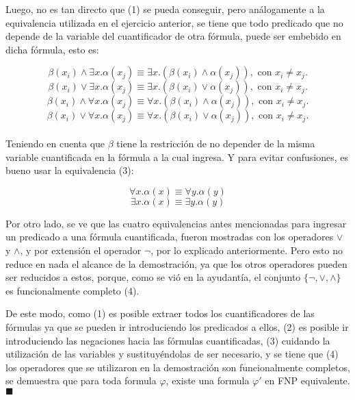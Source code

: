 \documentclass[letter]{article}
\begin{document}
\begin{pregunta}{2}
\begin{enumerate}
			Luego, no es tan directo que (1) se pueda conseguir, pero análogamente a la equivalencia utilizada en el ejercicio anterior, se tiene que todo predicado que no depende de la variable del cuantificador de otra fórmula, puede ser embebido en dicha fórmula, esto es:
			
			$$\beta(x_i) \wedge \exists x. \alpha(x_j) \equiv \exists x. (\beta(x_i) \wedge \alpha(x_j)), \text{\ \ \ \ \ con $x_i\neq x_j$.}$$
			$$\beta(x_i) \vee \exists x. \alpha(x_j) \equiv \exists x. (\beta(x_i) \vee \alpha(x_j)), \text{\ \ \ \ \ con $x_i\neq x_j$.}$$
			$$\beta(x_i) \wedge \forall x. \alpha(x_j) \equiv \forall x. (\beta(x_i) \wedge \alpha(x_j)), \text{\ \ \ \ \ con $x_i\neq x_j$.}$$
			$$\beta(x_i) \vee \forall x. \alpha(x_j) \equiv \forall x. (\beta(x_i) \vee \alpha(x_j)), \text{\ \ \ \ \ con $x_i\neq x_j$.}$$ \\
			
			Teniendo en cuenta que $\beta$ tiene la restricción de no depender de la misma variable cuantificada en la fórmula a la cual ingresa. Y para evitar confusiones, es bueno usar la equivalencia (3):
			
			$$\forall x. \alpha(x) \equiv \forall y. \alpha(y)$$
			$$\exists x. \alpha(x) \equiv \exists y. \alpha(y)$$
			
			Por otro lado, se ve que las cuatro equivalencias antes mencionadas para ingresar un predicado a una fórmula cuantificada, fueron mostradas con los operadores $\vee$ y $\wedge$, y por extensión el operador $\neg$, por lo explicado anteriormente. Pero esto no reduce en nada el alcance de la demostración, ya que los otros operadores pueden ser reducidos a estos, porque, como se vió en la ayudantía, el conjunto $\{\neg, \vee, \wedge\}$ es funcionalmente completo (4).
			
			De este modo, como (1) es posible extraer todos los cuantificadores de las fórmulas ya que se pueden ir introduciendo los predicados a ellos, (2) es posible ir introduciendo las negaciones hacia las fórmulas cuantificadas, (3) cuidando la utilización de las variables y sustituyéndolas de ser necesario, y se tiene que (4) los operadores que se utilizaron en la demostración son funcionalmente completos, se demuestra que para toda formula $\varphi$, existe una formula $\varphi '$ en FNP equivalente. \flushright $\blacksquare$
			
		\end{enumerate}
		
	\end{pregunta}
\end{document}
